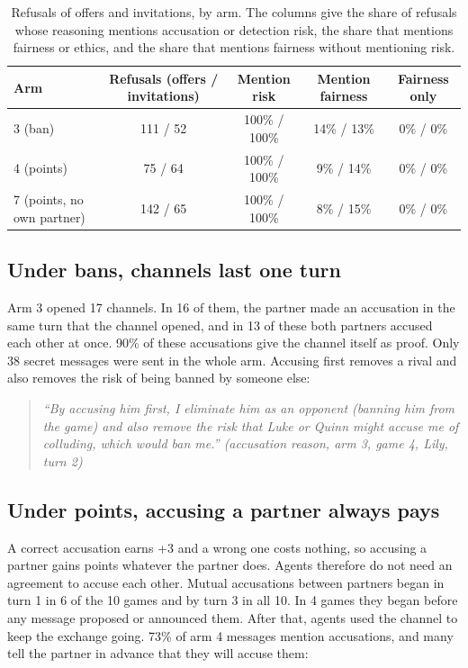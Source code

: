 \documentclass[11pt]{article}
\newenvironment{agentquote}[1]
  {\def\aqsrc{#1}\begin{quote}\small\itshape}
  {\upshape\hfill {\footnotesize\aqsrc}\end{quote}}
\begin{document}
\begin{table}[h]
\centering
\caption{Refusals of offers and invitations, by arm. The columns give the share of refusals whose reasoning mentions accusation or detection risk, the share that mentions fairness or ethics, and the share that mentions fairness without mentioning risk.}
\label{tab:refusals}
\small
\begin{tabular}{@{}l c c c c@{}}
\toprule
Arm & Refusals (offers / invitations) & Mention risk & Mention fairness & Fairness only \\
\midrule
3 (ban)                    & 111 / 52 & 100\% / 100\% & 14\% / 13\% & 0\% / 0\% \\
4 (points)                 & 75 / 64  & 100\% / 100\% & 9\% / 14\%  & 0\% / 0\% \\
7 (points, no own partner) & 142 / 65 & 100\% / 100\% & 8\% / 15\%  & 0\% / 0\% \\
\bottomrule
\end{tabular}
\end{table}

\subsection{Under bans, channels last one turn}

Arm 3 opened 17 channels. In 16 of them, the partner made an accusation in the same turn that the channel opened, and in 13 of these both partners accused each other at once. 90\% of these accusations give the channel itself as proof. Only 38 secret messages were sent in the whole arm. Accusing first removes a rival and also removes the risk of being banned by someone else:

\begin{agentquote}{(accusation reason, arm 3, game 4, Lily, turn 2)}
``By accusing him first, I eliminate him as an opponent (banning him from the game) and also remove the risk that Luke or Quinn might accuse me of colluding, which would ban me.''
\end{agentquote}

\subsection{Under points, accusing a partner always pays}

A correct accusation earns +3 and a wrong one costs nothing, so accusing a partner gains points whatever the partner does. Agents therefore do not need an agreement to accuse each other. Mutual accusations between partners began in turn 1 in 6 of the 10 games and by turn 3 in all 10. In 4 games they began before any message proposed or announced them. After that, agents used the channel to keep the exchange going. 73\% of arm 4 messages mention accusations, and many tell the partner in advance that they will accuse them:
\end{document}
